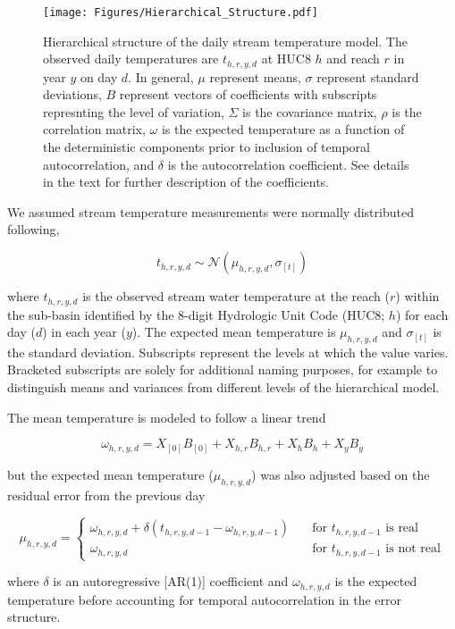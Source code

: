 \begin{figure}[htbp]
\centering
\texttt{[image: Figures/Hierarchical\_Structure.pdf]}
\caption{Hierarchical structure of the daily stream temperature model.
The observed daily temperatures are \(t_{h,r,y,d}\) at HUC8 \(h\) and
reach \(r\) in year \(y\) on day \(d\). In general, \(\mu\) represent
means, \(\sigma\) represent standard deviations, \(B\) represent vectors
of coefficients with subscripts represnting the level of variation,
\(\Sigma\) is the covariance matrix, \(\rho\) is the correlation matrix,
\(\omega\) is the expected temperature as a function of the
deterministic components prior to inclusion of temporal autocorrelation,
and \(\delta\) is the autocorrelation coefficient. See details in the
text for further description of the coefficients.}
\end{figure}

We assumed stream temperature measurements were normally distributed
following,

\[ t_{h,r,y,d} \sim \mathcal{N}(\mu_{h,r,y,d}, \sigma_{[t]}) \]

where \(t_{h,r,y,d}\) is the observed stream water temperature at the
reach (\(r\)) within the sub-basin identified by the 8-digit Hydrologic
Unit Code (HUC8; \(h\)) for each day (\(d\)) in each year (\(y\)). The
expected mean temperature is \(\mu_{h,r,y,d}\) and \(\sigma_{[t]}\) is
the standard deviation. Subscripts represent the levels at which the
value varies. Bracketed subscripts are solely for additional naming
purposes, for example to distinguish means and variances from different
levels of the hierarchical model.

The mean temperature is modeled to follow a linear trend

\[ \omega_{h,r,y,d} = X_{[0]} B_{[0]} + X_{h,r} B_{h,r} + X_{h} B_{h} + X_{y} B_{y} \]

but the expected mean temperature (\(\mu_{h,r,y,d}\)) was also adjusted
based on the residual error from the previous day

\[ \mu_{h,r,y,d} = \begin{cases}
    \omega_{h,r,y,d} + \delta(t_{h,r,y,d-1} - \omega_{h,r,y,d-1}) & \quad  \text{for $t_{h,r,y,d-1}$ is real} \\
    \omega_{h,r,y,d} & \quad  \text{for $t_{h,r,y,d-1}$ is not real}
  \end{cases}
 \]

where \(\delta\) is an autoregressive {[}AR(1){]} coefficient and
\(\omega_{h,r,y,d}\) is the expected temperature before accounting for
temporal autocorrelation in the error structure.

